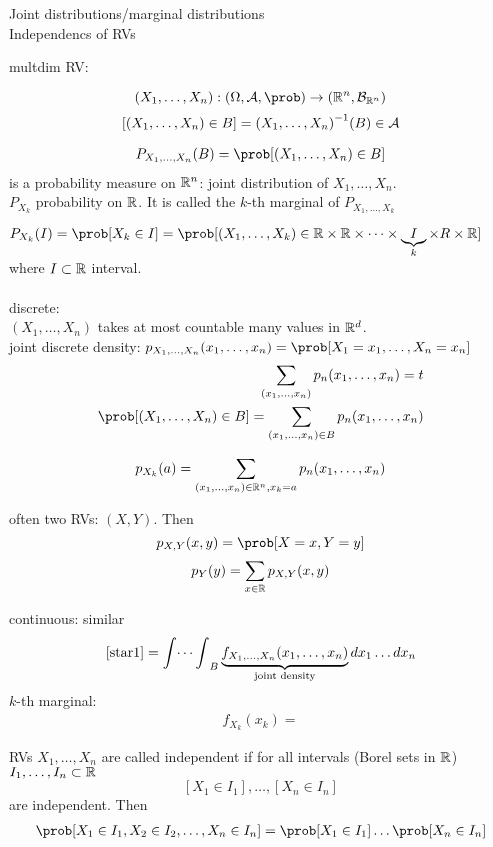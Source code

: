 \documentclass[mfit.tex]{subfiles}
\begin{document}

Joint distributions/marginal distributions\\
Independencs of RVs

multdim RV:

\[(X_1,\dots,X_n): (\Omega,\mathcal{A},\prob) \to (\R^n, \mathcal{B}_{\R^n}) \]
\[ [(X_1,\dots,X_n) \in B] = {(X_1,\dots,X_n)}^{-1}(B) \in \mathcal{A} \]

\begin{align} \label{star1}
  P_{X_1,\dots,X_n}(B) = \prob[(X_1,\dots,X_n) \in B]
\end{align}
is a probability measure on $\mathbb{R}^n$: joint distribution of $X_1,\dots,X_n$. \\
$P_{X_k}$ probability on $\mathbb{R}$. It is called the $k$-th marginal of $P_{X_1,\dots,X_k}$

$P_{X_k}(I) = \prob[X_k \in I] = \prob[(X_1,\dots,X_k) \in \R \times \R \times \dots \times \underbrace{I}_{k} \times R \times \R]$ where $I \subset \mathbb{R}$ interval.\\
\\
discrete:\\
$(X_1,\dots,X_n)$ takes at most countable many values in $\mathbb{R}^d$.\\
joint discrete density: $p_{X_1,\dots,X_n}(x_1,\dots,x_n) = \prob[X_1=x_1,\dots,X_n=x_n]$
\begin{align*}
  \sum_{(x_1,\dots,x_n)} p_n(x_1,\dots,x_n) = t \\
  \prob[(X_1,\dots,X_n) \in B] = \sum_{(x_1,\dots,x_n) \in B} p_n(x_1,\dots,x_n)
\end{align*}

\begin{align*}
  p_{X_k}(a) = \sum_{(x_1,\dots,x_n) \in \mathbb{R}^n, x_k = a} p_n(x_1,\dots,x_n) 
\end{align*}

often two RVs: $(X,Y)$. Then
\[ p_{X,Y} (x,y) = \prob[X = x, Y = y] \]
\[ p_Y(y) = \sum_{x \in \mathbb{R}} p_{X,Y} (x,y) \]

continuous: similar
\begin{align*}
  \ref{star1} = {\int \dots \int}_B \underbrace{f_{X_1,\dots,X_n} (x_1,\dots,x_n)}_{\text{joint density}} dx_1\dots dx_n
\end{align*}
$k$-th marginal:
\begin{align*}
  f_{X_k}(x_k) = 
\end{align*} 

\begin{defi*}
  RVs $X_1,\dots,X_n$ are called independent if for all intervals (Borel sets in $\mathbb{R}$) $I_1,\dots,I_n \subset \mathbb{R}$
  \[ [X_1 \in I_1],\dots,[X_n \in I_n]\]
  are independent.
  Then 
  \begin{align*}
    \prob[X_1 \in I_1, X_2 \in I_2,\dots,X_n \in I_n] = \prob[X_1 \in I_1] \dots \prob[X_n \in I_n]
  \end{align*}
\end{defi*}
\end{document}
